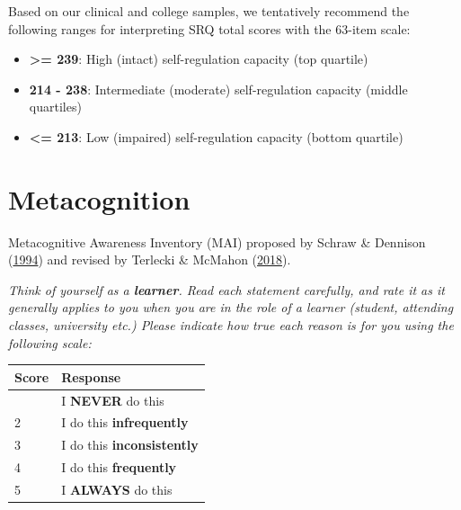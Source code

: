 \documentclass[letterpaper, nobind]{templates/ociamthesis}
\providecommand{\tightlist}{%
  \setlength{\itemsep}{0pt}\setlength{\parskip}{0pt}}
\begin{document}
Based on our clinical and college samples, we tentatively recommend the following ranges for interpreting SRQ total scores with the 63-item scale:

\begin{itemize}
\tightlist
\item
  \textbf{\textgreater= 239}: High (intact) self-regulation capacity (top quartile)
\item
  \textbf{214 - 238}: Intermediate (moderate) self-regulation capacity (middle quartiles)
\item
  \textbf{\textless= 213}: Low (impaired) self-regulation capacity (bottom quartile)
\end{itemize}

\hypertarget{app-qsnr-mai}{%
\section{Metacognition}\label{app-qsnr-mai}}

Metacognitive Awareness Inventory (MAI) proposed by
Schraw \& Dennison (\protect\hyperlink{ref-schraw1994assessing}{1994}) and revised by Terlecki \& McMahon (\protect\hyperlink{ref-terlecki2018call}{2018}).

\emph{Think of yourself as a \textbf{learner}. Read each statement carefully, and
rate it as it generally applies to you when you are in the role of a
learner (student, attending classes, university etc.) Please indicate
how true each reason is for you using the following scale:}

\begin{longtable}[]{@{}ll@{}}
\toprule\noalign{}
Score & Response \\
\midrule\noalign{}
\endhead
\bottomrule\noalign{}
\endlastfoot
1 & I \textbf{NEVER} do this \\
2 & I do this \textbf{infrequently} \\
3 & I do this \textbf{inconsistently} \\
4 & I do this \textbf{frequently} \\
5 & I \textbf{ALWAYS} do this \\
\end{longtable}
\end{document}
